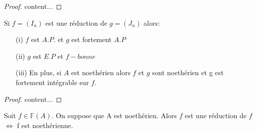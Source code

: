 \begin{proof}
	content...
\end{proof}
\begin{maproposition}
	Si $f=(I_n)$ est une réduction de $g=(J_n)$ alors:
	\begin{enumerate}
		\item[(i)] $f$ est $A.P.$ et $g$ est fortement $A.P$
		\item[(ii)] $g$ est $E.P$ et $f-bonne$
		\item[(iii)] En plus, si $A$ est noethérien alors $f$ et $g$ sont noethérien et g est fortement intégrable sur $f$.
	\end{enumerate}
\end{maproposition}
\begin{proof}
	content...
\end{proof}
\begin{maremarque}
	Soit $f \in \mathbb{F}(A)$. On suppose que A est noethérien. Alors $f$ est une réduction de $f$ $\Longleftrightarrow$ f est noethérienne.
\end{maremarque}
